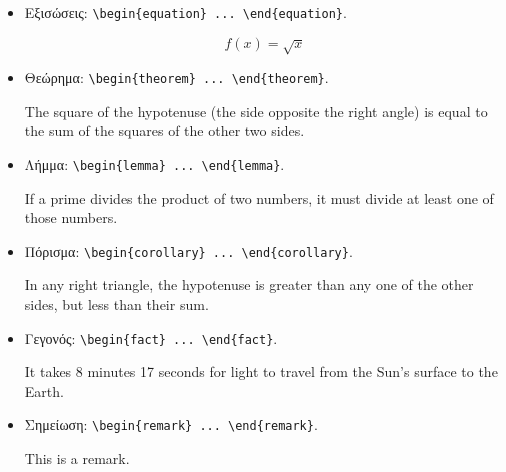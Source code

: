 \begin{itemize}
	\item Εξισώσεις: \verb|\begin{equation} ... \end{equation}|.

	\begin{equation}
	f(x) = \sqrt{x}
	\end{equation}

	\item Θεώρημα: \verb|\begin{theorem} ... \end{theorem}|.

	\begin{theorem}
	Τhe square of the hypotenuse (the side opposite the right angle) is equal to the sum of the squares of the other two sides.
	\end{theorem}

	\item Λήμμα: \verb|\begin{lemma} ... \end{lemma}|.

	\begin{lemma}
	If a prime divides the product of two numbers, it must divide at least one of those numbers.
	\end{lemma}

	\item Πόρισμα: \verb|\begin{corollary} ... \end{corollary}|.

	\begin{corollary}
	In any right triangle, the hypotenuse is greater than any one of the other sides, but less than their sum.
	\end{corollary}

	\item Γεγονός: \verb|\begin{fact} ... \end{fact}|.

	\begin{fact}
	It takes 8 minutes 17 seconds for light to travel from the Sun’s surface to the Earth.
	\end{fact}

	\item Σημείωση: \verb|\begin{remark} ... \end{remark}|.

	\begin{remark}
	This is a remark.
	\end{remark}


\end{itemize}
